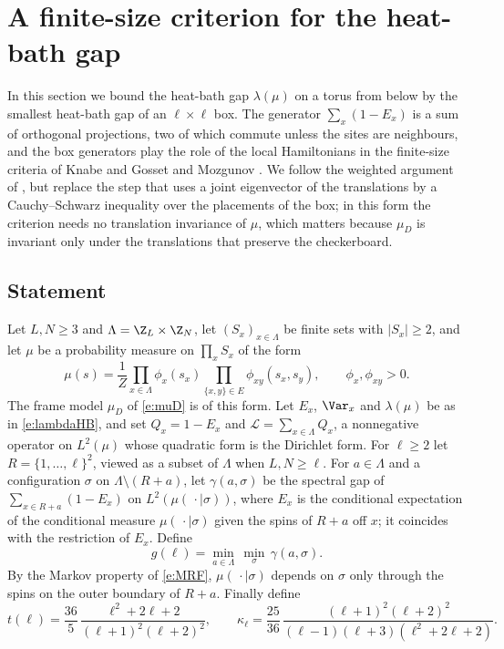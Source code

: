 \section{A finite-size criterion for the heat-bath gap}\label{s:knabe}

In this section we bound the heat-bath gap $\lambda(\mu)$ on a torus from below by the smallest heat-bath gap of an $\ell \times \ell$ box. The generator $\sum_x (1 - E_x)$ is a sum of orthogonal projections, two of which commute unless the sites are neighbours, and the box generators play the role of the local Hamiltonians in the finite-size criteria of Knabe \cite{Kna88} and Gosset and Mozgunov \cite{GM16}. We follow the weighted argument of \cite{GM16}, but replace the step that uses a joint eigenvector of the translations by a Cauchy--Schwarz inequality over the placements of the box; in this form the criterion needs no translation invariance of $\mu$, which matters because $\mu_D$ is invariant only under the translations that preserve the checkerboard.

\subsection{Statement}

Let $L, N \ge 3$ and $\Lambda = \Z_L \times \Z_N$, let $(S_x)_{x \in \Lambda}$ be finite sets with $|S_x|\ge2$, and let $\mu$ be a probability measure on $\prod_x S_x$ of the form
\begin{equation}\label{e:MRF}
\mu(s) = \frac{1}{Z} \prod_{x \in \Lambda} \phi_x(s_x) \prod_{\{x, y\} \in E} \phi_{xy}(s_x, s_y), \qquad \phi_x, \phi_{xy} > 0 .
\end{equation}
The frame model $\mu_D$ of \eqref{e:muD} is of this form. Let $E_x$, $\Var_x$ and $\lambda(\mu)$ be as in \eqref{e:lambdaHB}, and set $Q_x = 1 - E_x$ and $\mathcal L = \sum_{x \in \Lambda} Q_x$, a nonnegative operator on $L^2(\mu)$ whose quadratic form is the Dirichlet form. For $\ell \ge 2$ let $R = \{1, \dots, \ell\}^2$, viewed as a subset of $\Lambda$ when $L, N \ge \ell$. For $a \in \Lambda$ and a configuration $\sigma$ on $\Lambda \setminus (R + a)$, let $\gamma(a, \sigma)$ be the spectral gap of $\sum_{x \in R + a} (1 - E_x)$ on $L^2(\mu(\, \cdot \mid \sigma))$, where $E_x$ is the conditional expectation of the conditional measure $\mu(\, \cdot \mid \sigma)$ given the spins of $R + a$ off $x$; it coincides with the restriction of $E_x$. Define
\begin{equation}\label{e:gell}
g(\ell) = \min_{a \in \Lambda} \, \min_{\sigma} \, \gamma(a, \sigma) .
\end{equation}
By the Markov property of \eqref{e:MRF}, $\mu(\, \cdot \mid \sigma)$ depends on $\sigma$ only through the spins on the outer boundary of $R + a$. Finally define
\begin{equation}\label{e:tkappa}
t(\ell) = \frac{36}{5} \, \frac{\ell^2 + 2 \ell + 2}{(\ell + 1)^2 (\ell + 2)^2}, \qquad \kappa_\ell = \frac{25}{36} \, \frac{(\ell + 1)^2 (\ell + 2)^2}{(\ell - 1)(\ell + 3)(\ell^2 + 2 \ell + 2)} .
\end{equation}

